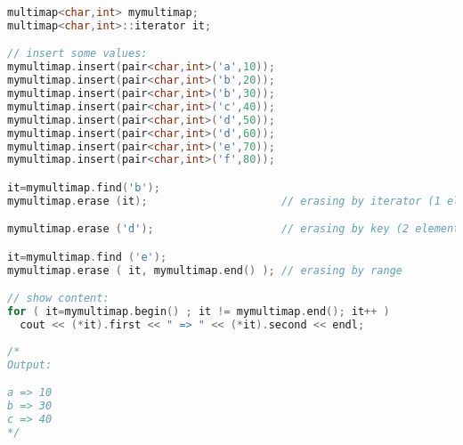 	\begin{lstlisting}[language=c++]
multimap<char,int> mymultimap;
multimap<char,int>::iterator it;

// insert some values:
mymultimap.insert(pair<char,int>('a',10));
mymultimap.insert(pair<char,int>('b',20));
mymultimap.insert(pair<char,int>('b',30));
mymultimap.insert(pair<char,int>('c',40));
mymultimap.insert(pair<char,int>('d',50));
mymultimap.insert(pair<char,int>('d',60));
mymultimap.insert(pair<char,int>('e',70));
mymultimap.insert(pair<char,int>('f',80));

it=mymultimap.find('b');
mymultimap.erase (it);                     // erasing by iterator (1 element)

mymultimap.erase ('d');                    // erasing by key (2 elements)

it=mymultimap.find ('e');
mymultimap.erase ( it, mymultimap.end() ); // erasing by range

// show content:
for ( it=mymultimap.begin() ; it != mymultimap.end(); it++ )
  cout << (*it).first << " => " << (*it).second << endl;
    
/*
Output:

a => 10
b => 30
c => 40
*/
	\end{lstlisting}